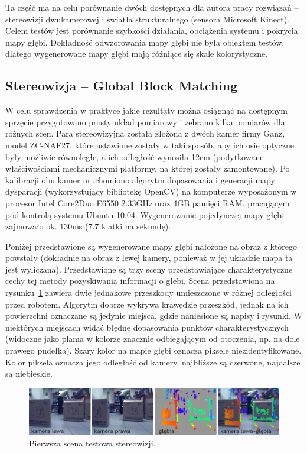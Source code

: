 Ta część ma na celu porównanie dwóch dostępnych dla autora pracy rozwiązań --
stereowizji dwukamerowej i światła strukturalnego (sensora Microsoft Kinect).
Celem testów jest porównanie szybkości działania, obciążenia systemu i pokrycia
mapy głębi. Dokładność odwzorowania mapy głębi nie była obiektem testów, dlatego
wygenerowane mapy głębi mają różniące się skale kolorystyczne.

\subsection{Stereowizja -- Global Block Matching}

W celu sprawdzenia w praktyce jakie rezultaty można osiągnąć na dostępnym sprzęcie
przygotowano prosty układ pomiarowy i zebrano kilka pomiarów dla różnych scen.
Para stereowizyjna została złożona z dwóch kamer firmy Ganz, model ZC-NAF27, które
ustawione zostały w taki sposób, aby ich osie optyczne były możliwie równoległe,
a ich odległość wynosiła 12cm (podytkowane właściwościami mechanicznymi platformy,
na której zostały zamontowane). Po kalibracji obu kamer uruchomiono algorytm
dopasowania i generacji mapy dysparacji (wykorzystujący bibliotekę OpenCV) na
komputerze wyposażonym w procesor Intel Core2Duo E6550 2.33GHz oraz 4GB pamięci
RAM, pracującym pod kontrolą systemu Ubuntu 10.04. Wygenerowanie pojedynczej mapy
głębi zajmowało ok. 130ms (7.7 klatki na sekundę).

Poniżej przedstawione są wygenerowane mapy głębi nałożone na obraz z którego powstały
(dokładnie na obraz z lewej kamery, ponieważ w jej układzie mapa ta jest wyliczana).
Przedstawione są trzy sceny przedstawiające charakterystyczne cechy tej metody
pozyskiwania informacji o głebi. Scena przedstawiona na rysunku~\ref{fig:stereo_1}
zawiera dwie jednakowe przeszkody umieszczone w różnej odległości przed robotem.
Algorytm dobrze wykrywa krawędzie przeszkód, jednak na ich powierzchni oznaczane
są jedynie miejsca, gdzie naniesione są napisy i rysunki. W niektórych miejscach
widać błędne dopasowania punktów charakterystycznych (widoczne jako plama w kolorze
znacznie odbiegającym od otoczenia, np. na dole prawego pudełka). Szary kolor na
mapie głębi oznacza piksele niezidentyfikowane. Kolor piksela oznacza jego odległość
od kamery, najbliższe są czerwone, najdalsze są niebieskie.

\begin{figure}[h!]
\centering
\includegraphics{../../Common/img/stereo_1}
\caption[Pierwsza scena testowa stereowizji]{Pierwsza scena testowa stereowizji.}
\label{fig:stereo_1}
\end{figure}

